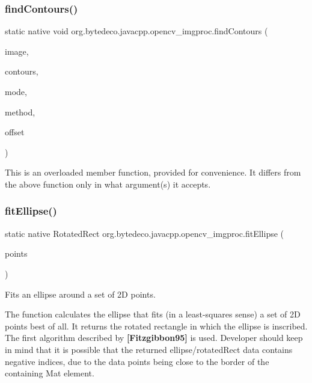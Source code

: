 \subsubsection{\texorpdfstring{find\+Contours()}{fr.antproject.utils.findContours()}\hspace{0.1cm}{\footnotesize\ttfamily [2/2]}}
{\footnotesize\ttfamily static native void org.\+bytedeco.\+javacpp.\+opencv\+\_\+imgproc.\+find\+Contours (\begin{DoxyParamCaption}\item[{@By\+Val Mat}]{image,  }\item[{@By\+Val Mat\+Vector}]{contours,  }\item[{int}]{mode,  }\item[{int}]{method,  }\item[{@By\+Val(null\+Value=\char`\"{}cv\+::\+fr.antproject.utils.Point()\char`\"{}) fr.antproject.utils.Point}]{offset }\end{DoxyParamCaption})\hspace{0.3cm}{\ttfamily [static]}}

This is an overloaded member function, provided for convenience. It differs from the above function only in what argument(s) it accepts. \mbox{\label{group__imgproc__shape_ga4e705f42eefa1224c87285653b6fb44d}} 
\subsubsection{\texorpdfstring{fit\+Ellipse()}{fitEllipse()}}
{\footnotesize\ttfamily static native Rotated\+Rect org.\+bytedeco.\+javacpp.\+opencv\+\_\+imgproc.\+fit\+Ellipse (\begin{DoxyParamCaption}\item[{@By\+Val Mat}]{points }\end{DoxyParamCaption})\hspace{0.3cm}{\ttfamily [static]}}



Fits an ellipse around a set of 2D points. 

The function calculates the ellipse that fits (in a least-\/squares sense) a set of 2D points best of all. It returns the rotated rectangle in which the ellipse is inscribed. The first algorithm described by {\bfseries [Fitzgibbon95]} is used. Developer should keep in mind that it is possible that the returned ellipse/rotated\+Rect data contains negative indices, due to the data points being close to the border of the containing Mat element. 


